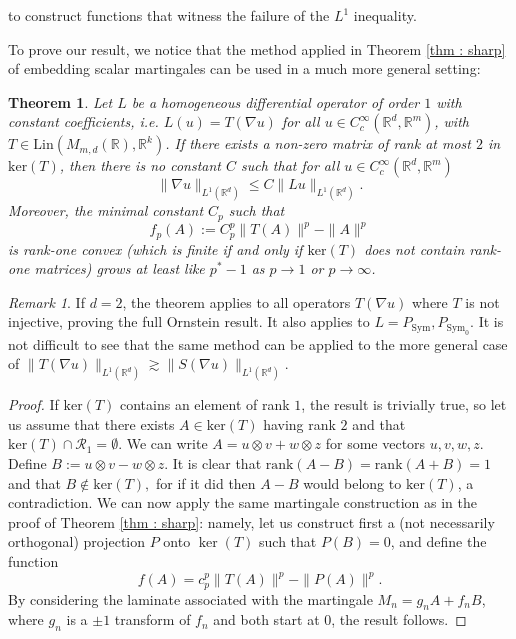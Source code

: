 \documentclass[11pt, a4paper, reqno]{elsarticle}
\newtheorem{theorem}{Theorem}[section]
\theoremstyle{definition}
\theoremstyle{remark}
\newtheorem{remark}{Remark}
\begin{document}
 to construct functions that witness the failure of the $L^1$ inequality.
 \par To prove our result, we notice that
 the method applied in Theorem \ref{thm : sharp}
 of embedding scalar martingales can be 
 used in a much more general setting:
 \begin{theorem}
    Let $L$ be a homogeneous differential operator of order $1$ with 
 constant coefficients, i.e. $L(u)=T(\nabla u)$ for all $u\in C^\infty_c(\mathbb{R}^d, \mathbb{R}^m)$, with $T\in \mathrm{Lin}(M_{m,d}(\mathbb{R}), \mathbb{R}^k)$. If there exists a non-zero matrix of rank at most $2$
     in $\mathrm{ker}(T)$, then there is no
     constant $C$ such that for all $u\in C^\infty_c(\mathbb{R}^d,\mathbb{R}^m)$
     \begin{equation*}
         \|\nabla u\|_{L^1(\mathbb R^d)}\le C\|Lu\|_{L^1(\mathbb R^d)}.
     \end{equation*}
     Moreover, the minimal constant $C_p$ such that
     \begin{equation*}
         f_p(A):=C_p^p\|T(A)\|^p-\|A\|^p
     \end{equation*}
     is rank-one convex (which is finite if and only if $\mathrm{ker}(T)$ does not contain rank-one matrices) grows at least like $p^*-1$
     as $p\to 1$ or $p\to \infty$.
 \end{theorem}
 \begin{remark}
     If $d=2$, the theorem applies to all operators
     $T(\nabla u)$ where $T$ is not injective, proving
     the full Ornstein result. It also applies to $L=P_{\mathrm{Sym}},
     P_{\mathrm{Sym}_0}$.
     It is not difficult
     to see that the same method can be applied to the
     more general case of
     $\|T(\nabla u)\|_{L^1(\mathbb{R}^d)}\gtrsim \|S(\nabla u)\|_{L^1(\mathbb{R}^d)}.$
 \end{remark}
 \begin{proof}
 If $\mathrm{ker}(T)$ contains an element of rank $1$,
 the result is trivially true, so let us assume that
 there exists $A\in \mathrm{ker}(T)$ having rank $2$
 and that $\mathrm{ker}(T)\cap \mathcal R_1=\emptyset$.
 We can write $A=u\otimes v+w\otimes z$
 for some vectors $u,v,w,z$. Define $B:=u\otimes v-w\otimes z$. It is clear that $\mathrm{rank}(A-B)=
 \mathrm{rank}(A+B)=1$ and that $B\not \in\mathrm{ker}(T),$ for if it did then $ A-B$ would belong to $\mathrm{ker}(T)$,
 a contradiction. We can now apply the same martingale
 construction as in the proof of Theorem \ref{thm : sharp}: namely, let us construct
 first a (not necessarily orthogonal) projection $P$
 onto $\ker(T)$
 such that $P(B)=0$, and define the function
 \begin{equation*}
     f(A)=c_p^p\|T(A)\|^p-\|P(A)\|^p.
 \end{equation*}
 By considering the laminate associated with the
 martingale $M_n=g_nA+f_nB$, where $g_n$ is a $\pm1$ transform of $f_n$ and both start at $0$, the result follows. 
 \end{proof}
\end{document}
